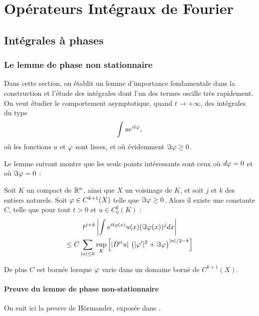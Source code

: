 \chapter{Opérateurs Intégraux de Fourier}

\section{Intégrales à phases}

\subsection{Le lemme de phase non stationnaire}
Dans cette section, on établit un lemme d'importance fondamentale dans la
construction et l'étude des intégrales dont l'un des termes oscille très
rapidement. On veut étudier le comportement asymptotique, quand $t \to
+\infty$, des intégrales du type
\begin{equation*}
  \int u e^{it\varphi},
\end{equation*}
\noindent où les fonctions $u$ et $\varphi$ sont lisses, et où évidemment $\Im
\varphi \geq 0$.

Le lemme suivant montre que les seuls points intéressants sont ceux où
$d\varphi=0$ et où $\Im \varphi =0$ :
\begin{lem}
\label{lem:phasenonstat}
Soit $K$ un compact de $\mathbb{R}^n$, ainsi que $X$ un voisinage de $K$, et soit $j$ et
$k$ des entiers naturels. Soit $\varphi \in C^{k+1}(X)$
telle que $\Im \varphi \geq 0$. Alors il existe une constante $C$, telle que
pour tout $t>0$ et $u \in C^k_0(K)$ :
\begin{multline*}
  t^{j+k}\left|\int e^{it\varphi(x)}u(x)(\Im \varphi(x))^j dx\right| \\\leq C
    \sum_{|\alpha| \leq k} \underset{K}{\sup}\left[|D^{\alpha}u|\,\left(|\varphi'|^2 + \Im \varphi\right)^{|\alpha|/2-k}\right]
\end{multline*}

\noindent De plus $C$ est bornée lorsque $\varphi$ varie dans un domaine borné de $C^{k+1}(X)$.
\end{lem}

\subsubsection{Preuve du lemme de phase non-stationnaire}

On suit ici la preuve de Hörmander, exposée dans \cite{hormander2003analysis}.


